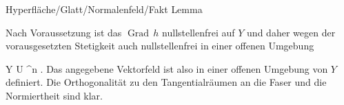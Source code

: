 {Hyperfläche/Glatt/Normalenfeld/Fakt}
{Lemma}
{}
{

\faktzusatz {}
\faktzusatz {}

}
{

Nach Voraussetzung ist das
$\operatorname{Grad} \,  h$ nullstellenfrei auf $Y$ und daher wegen der vorausgesetzten Stetigkeit auch nullstellenfrei in einer offenen Umgebung

\mavergleichskette
{\vergleichskette
{ Y
}
{ \subseteq }{ U
}
{ \subseteq }{ \R^n
}
{    }{
}
{   }{
}
}
{}{}{.}
Das angegebene Vektorfeld ist also in einer offenen Umgebung von $Y$ definiert. Die Orthogonalität zu den Tangentialräumen an die Faser und die Normiertheit sind klar.

}

